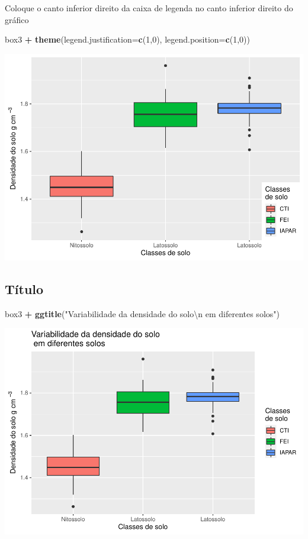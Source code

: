 \documentclass[]{book}
\newenvironment{Shaded}{\begin{snugshade}}{\end{snugshade}}
\newcommand{\CharTok}[1]{\textcolor[rgb]{0.31,0.60,0.02}{#1}}
\newcommand{\DataTypeTok}[1]{\textcolor[rgb]{0.13,0.29,0.53}{#1}}
\newcommand{\DecValTok}[1]{\textcolor[rgb]{0.00,0.00,0.81}{#1}}
\newcommand{\KeywordTok}[1]{\textcolor[rgb]{0.13,0.29,0.53}{\textbf{#1}}}
\newcommand{\NormalTok}[1]{#1}
\newcommand{\OperatorTok}[1]{\textcolor[rgb]{0.81,0.36,0.00}{\textbf{#1}}}
\newcommand{\StringTok}[1]{\textcolor[rgb]{0.31,0.60,0.02}{#1}}
\begin{document}
Coloque o canto inferior direito da caixa de legenda no canto inferior direito do gráfico

\begin{Shaded}
\begin{Highlighting}[]
\NormalTok{box3 }\OperatorTok{+}\StringTok{ }\KeywordTok{theme}\NormalTok{(}\DataTypeTok{legend.justification=}\KeywordTok{c}\NormalTok{(}\DecValTok{1}\NormalTok{,}\DecValTok{0}\NormalTok{), }\DataTypeTok{legend.position=}\KeywordTok{c}\NormalTok{(}\DecValTok{1}\NormalTok{,}\DecValTok{0}\NormalTok{))}
\end{Highlighting}
\end{Shaded}

\includegraphics{TudodoR_files/figure-latex/unnamed-chunk-218-1.pdf}

\hypertarget{titulo}{%
\subsection{Título}\label{titulo}}

\begin{Shaded}
\begin{Highlighting}[]
\NormalTok{box3 }\OperatorTok{+}\StringTok{ }\KeywordTok{ggtitle}\NormalTok{(}\StringTok{"Variabilidade da densidade do solo}\CharTok{\textbackslash{}n}\StringTok{ em diferentes solos"}\NormalTok{)}
\end{Highlighting}
\end{Shaded}

\includegraphics{TudodoR_files/figure-latex/unnamed-chunk-219-1.pdf}
\end{document}
